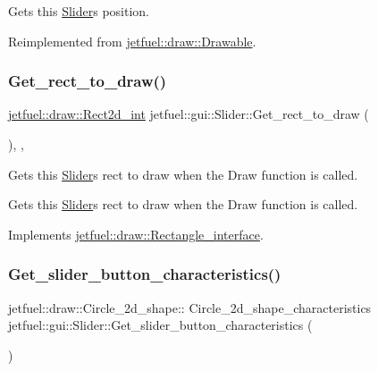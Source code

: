 Gets this \hyperlink{classjetfuel_1_1gui_1_1Slider}{Slider}\textquotesingle{}s position. 

Reimplemented from \hyperlink{classjetfuel_1_1draw_1_1Drawable_ae7ebd30d66db2c8a5d5371cbcf0023fc}{jetfuel\+::draw\+::\+Drawable}.

\mbox{\label{classjetfuel_1_1gui_1_1Slider_abab31dbe01b716b4e82919f0d8aba96c}} 
\subsubsection{\texorpdfstring{Get\+\_\+rect\+\_\+to\+\_\+draw()}{Get\_rect\_to\_draw()}}
{\footnotesize\ttfamily \hyperlink{classjetfuel_1_1draw_1_1Rect2d}{jetfuel\+::draw\+::\+Rect2d\+\_\+int} jetfuel\+::gui\+::\+Slider\+::\+Get\+\_\+rect\+\_\+to\+\_\+draw (\begin{DoxyParamCaption}{ }\end{DoxyParamCaption})\hspace{0.3cm}{\ttfamily [inline]}, {\ttfamily [override]}, {\ttfamily [virtual]}}



Gets this \hyperlink{classjetfuel_1_1gui_1_1Slider}{Slider}\textquotesingle{}s rect to draw when the Draw function is called. 

Gets this \hyperlink{classjetfuel_1_1gui_1_1Slider}{Slider}\textquotesingle{}s rect to draw when the Draw function is called. 

Implements \hyperlink{classjetfuel_1_1draw_1_1Rectangle__interface_a03fd3b6842ab7b3065379caec407296f}{jetfuel\+::draw\+::\+Rectangle\+\_\+interface}.

\mbox{\label{classjetfuel_1_1gui_1_1Slider_a179af5f98738a5011b8608e656fdb090}} 
\subsubsection{\texorpdfstring{Get\+\_\+slider\+\_\+button\+\_\+characteristics()}{Get\_slider\_button\_characteristics()}}
{\footnotesize\ttfamily jetfuel\+::draw\+::\+Circle\+\_\+2d\+\_\+shape\+:: Circle\+\_\+2d\+\_\+shape\+\_\+characteristics jetfuel\+::gui\+::\+Slider\+::\+Get\+\_\+slider\+\_\+button\+\_\+characteristics (\begin{DoxyParamCaption}{ }\end{DoxyParamCaption})\hspace{0.3cm}{\ttfamily [inline]}}



